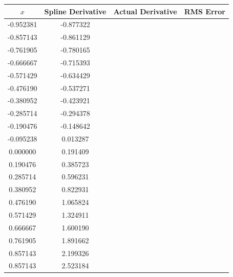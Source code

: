 \documentclass[11pt]{article} %
\begin{document}
\renewcommand{\arraystretch}{1.3} %
\begin{tabular}{| c | c c c |}
\hline
$x$ & Spline Derivative & Actual Derivative & RMS Error\\
\hline
-0.952381 & -0.877322 &  & \\
-0.857143 &-0.861129  &  & \\
-0.761905 & -0.780165 & &  \\
-0.666667 & 	-0.715393 & &  \\
-0.571429 &  -0.634429& &  \\
-0.476190 &-0.537271 & &  \\
-0.380952 &-0.423921  & &  \\
-0.285714 & -0.294378 & &  \\
-0.190476 & -0.148642 & &  \\
-0.095238 & 0.013287  & &  \\
0.000000 & 	0.191409 & &  \\
0.190476 & 0.385723 & &  \\
0.285714 & 0.596231& &  \\
0.380952 & 	0.822931 & &  \\
0.476190 & 1.065824 & &  \\
0.571429 & 1.324911 & &  \\
0.666667 &  1.600190& &  \\
0.761905 & 	1.891662 & &  \\
0.857143 & 2.199326 & &  \\
0.857143 & 2.523184 & &  \\

\hline
\end{tabular}
\end{document}
